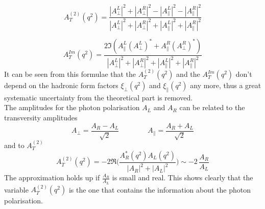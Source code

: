 \begin{equation}
A^{(2)}_T(q^2) = \frac{|A^{L}_{ \perp }|^2 + |A^{R}_{ \perp }|^2 - |A^{L}_{ \parallel }|^2 - |A^{R}_{ \parallel }|^2 }{|A^{L}_{ \perp }|^2 + |A^{R}_{ \perp }|^2 + |A^{L}_{ \parallel }|^2 + |A^{R}_{ \parallel }|^2}
\end{equation}

\begin{equation}
A^{Im}_T(q^2) = \frac{2 \Im (A^{L}_{ \parallel } (A^{L}_{ \perp })^* + A^{R}_{ \parallel } (A^{R}_{ \perp })^*)}{|A^{L}_{ \perp }|^2 + |A^{R}_{ \perp }|^2 + |A^{L}_{ \parallel }|^2 + |A^{R}_{ \parallel }|^2}
\end{equation}
It can be seen from this formulae that the $A^{(2)}_T(q^2)$ and the $A^{Im}_T(q^2)$ don't depend on the hadronic form factors $\xi_{ \perp }(q^2)$ and $\xi_{ \parallel }(q^2)$ any more, thus a great systematic uncertainty from the theoretical part is removed.\\
The amplitudes for the photon polarisation $A_L$ and $A_R$ can be related to the transversity amplitudes
\begin{equation}
A_{\perp} = \frac{A_R - A_L}{\sqrt{2}} \qquad \qquad  A_{\parallel} = \frac{A_R + A_L}{\sqrt{2}}
\end{equation}
and to $A^{(2)}_T$
\begin{equation}
A^{(2)}_T(q^2) = -2 \Re \Big( \frac{A^*_R(q^2)A_L(q^2)}{|A_R| ^2+ |A_L|^2} \Big) \sim - 2\, \frac{A_R}{A_L}
\end{equation}
The approximation holds up if $\frac{A_R}{A_L}$ is small and real.
This shows clearly that the variable $A^{(2)}_T(q^2)$ is the one that contains the information about the photon polarisation.\\
\newpage
